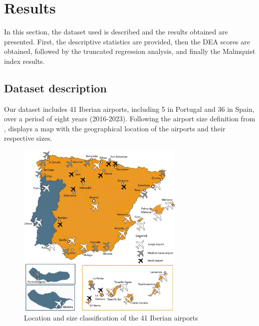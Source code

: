 
\section{Results}
\label{sec:resul}
In this section, the dataset used is described and the results obtained are presented. First, the descriptive statistics are provided, then the DEA scores are obtained, followed by the truncated regression analysis, and finally the Malmquist index results.
\subsection{Dataset description}
\label{subsec:resul_data}
Our dataset includes 41 Iberian airports, including 5 in Portugal and 36 in Spain, over a period of eight years (2016-2023). Following the airport size definition from \cite{ripoll-zarraga2020},  displays a map with the geographical location of the airports and their respective sizes.  


\begin{figure}[h!]
  \centering
  \includegraphics[width=8cm]{images/mapa.jpg}
  \vspace{-0.5cm}
  \caption{Location and size classification of the 41 Iberian airports}
  \label{fig:mapa}
\end{figure}

